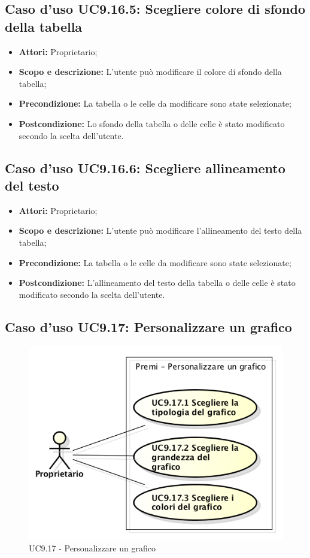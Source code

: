 	\subsection{Caso d'uso UC9.16.5: Scegliere colore di sfondo della tabella}
	\begin{itemize}
		\item \textbf{Attori:} Proprietario;
		\item \textbf{Scopo e descrizione:} L'utente può modificare il colore di sfondo della tabella;
		\item \textbf{Precondizione:} La tabella o le celle da modificare sono state selezionate;
		\item \textbf{Postcondizione:} Lo sfondo della tabella o delle celle è stato modificato secondo la scelta dell'utente.
	\end{itemize}
	
	\subsection{Caso d'uso UC9.16.6: Scegliere allineamento del testo}
	\begin{itemize}
		\item \textbf{Attori:} Proprietario;
		\item \textbf{Scopo e descrizione:} L'utente può modificare l'allineamento del testo della tabella;
		\item \textbf{Precondizione:} La tabella o le celle da modificare sono state selezionate;
		\item \textbf{Postcondizione:} L'allineamento del testo della tabella o delle celle è stato modificato secondo la scelta dell'utente.
	\end{itemize}
	
	
	\subsection{Caso d'uso UC9.17: Personalizzare un grafico}
	\begin{figure}[h] 
		\centering 
		\includegraphics[scale=0.45] {img/UC9.17.png}
		\caption{UC9.17 - Personalizzare un grafico} 
	\end{figure}
	
